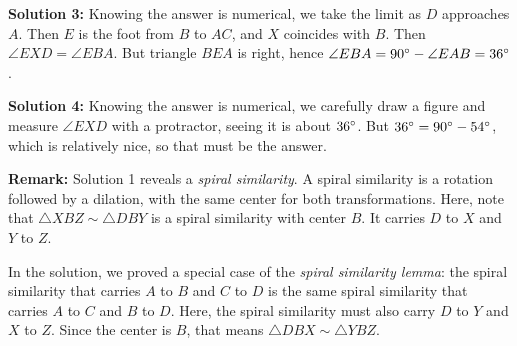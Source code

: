 \documentclass[11pt,paper=letter]{scrartcl}
\begin{document}
\begin{enumerate}[left=0pt]
\textbf{Solution 3:} Knowing the answer is numerical, we take the limit as $D$ approaches $A$. Then $E$ is the foot from $B$ to $AC$, and $X$ coincides with $B$. Then $\angle EXD = \angle EBA$. But triangle $BEA$ is right, hence $\angle EBA = 90^\circ - \angle EAB = 36^\circ$.
\begin{center}
\end{center}

\textbf{Solution 4:} Knowing the answer is numerical, we carefully draw a figure and measure $\angle EXD$ with a protractor, seeing it is about $36^\circ$. But $36^\circ = 90^\circ - 54^\circ$, which is relatively nice, so that must be the answer.

\textbf{Remark:} Solution 1 reveals a \emph{spiral similarity}. A spiral similarity is a rotation followed by a dilation, with the same center for both transformations. Here, note that $\triangle XBZ \sim \triangle DBY$ is a spiral similarity with center $B$. It carries $D$ to $X$ and $Y$ to $Z$.

In the solution, we proved a special case of the \emph{spiral similarity lemma}: the spiral similarity that carries $A$ to $B$ and $C$ to $D$ is the same spiral similarity that carries $A$ to $C$ and $B$ to $D$. Here, the spiral similarity must also carry $D$ to $Y$ and $X$ to $Z$. Since the center is $B$, that means $\triangle DBX \sim \triangle YBZ$.


\end{enumerate}
\end{document}
